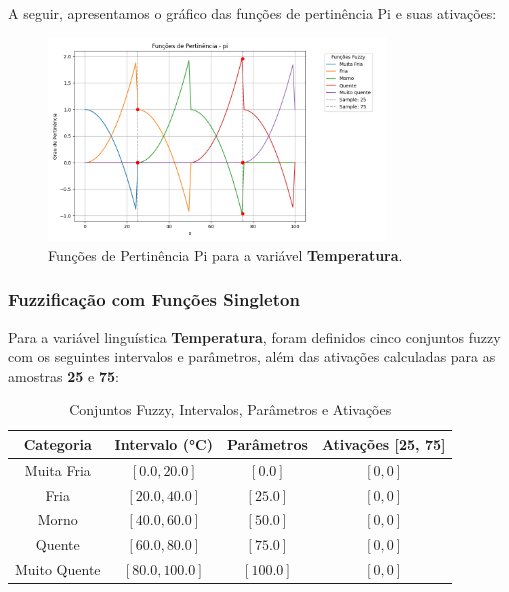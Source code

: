 \documentclass[a4paper,12pt]{article}
\begin{document}
A seguir, apresentamos o gráfico das funções de pertinência Pi e suas ativações:

\begin{figure}[H]
    \centering
    \includegraphics[width=0.8\textwidth]{img/funções_de_pertinência_pi_fuzzificado.png}
    \caption{Funções de Pertinência Pi para a variável \textbf{Temperatura}.}
\end{figure}

\subsubsection{Fuzzificação com Funções Singleton}

Para a variável linguística \textbf{Temperatura}, foram definidos cinco conjuntos fuzzy com os seguintes intervalos e parâmetros, além das ativações calculadas para as amostras \textbf{25} e \textbf{75}:

\begin{table}[H]
\centering
\caption{Conjuntos Fuzzy, Intervalos, Parâmetros e Ativações}
\begin{tabular}{|c|c|c|c|}
\hline
\textbf{Categoria}    & \textbf{Intervalo (°C)} & \textbf{Parâmetros}       & \textbf{Ativações [25, 75]} \\ \hline
Muita Fria            & $[0.0, 20.0]$          & $[0.0]$                   & $[0, 0]$                   \\ \hline
Fria                  & $[20.0, 40.0]$         & $[25.0]$                  & $[0, 0]$                   \\ \hline
Morno                 & $[40.0, 60.0]$         & $[50.0]$                  & $[0, 0]$                   \\ \hline
Quente                & $[60.0, 80.0]$         & $[75.0]$                  & $[0, 0]$                   \\ \hline
Muito Quente          & $[80.0, 100.0]$        & $[100.0]$                 & $[0, 0]$                   \\ \hline
\end{tabular}
\end{table}
\end{document}
